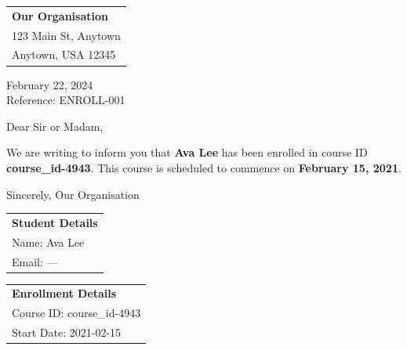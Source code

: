 \documentclass{article}
\begin{document}
\begin{tabular}{@{}l@{}}
\textbf{Our Organisation} \\
123 Main St, Anytown \\
Anytown, USA 12345 \\
\end{tabular}\par
\vspace{-1em}
February 22, 2024 \\
Reference: ENROLL-001

Dear Sir or Madam,

We are writing to inform you that \textbf{Ava Lee} has been enrolled in course ID \textbf{course\_id-4943}. This course is scheduled to commence on \textbf{February 15, 2021}.

Sincerely,
Our Organisation
\begin{tabular}{@{}l@{}}
\textbf{Student Details} \\
Name: Ava Lee \\
Email: --- \\
\end{tabular}\par
\vspace{-1em}
\begin{tabular}{@{}l@{}}
\textbf{Enrollment Details} \\
Course ID: course\_id-4943 \\
Start Date: 2021-02-15 \\
\end{tabular}
\end{document}
